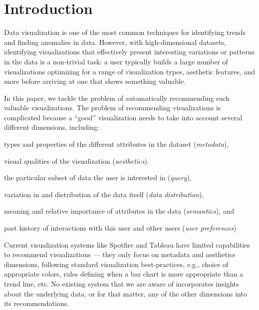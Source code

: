 
\section{Introduction}
\label{sec:introduction}


Data visualization is one of the most common techniques for identifying 
trends and finding anomalies in data.
However, with high-dimensional datasets, identifying visualizations that 
effectively present interesting variations or patterns in the data is a non-trivial task:  a
user typically builds a large number of visualizations optimizing for a range of visualization 
types, aesthetic features, and more
before arriving at one that shows something valuable.


In this paper, we tackle the problem of automatically recommending such valuable visualizations.
The problem of recommending visualizations is complicated because a ``good'' visualization needs to take into account several different dimensions, including:
\begin{inparaenum}
\item types and properties of the different attributes in the dataset ({\it metadata}), 
\item visual qualities of the visualization ({\it aesthetics}). 
\item the particular subset of data the user is interested in ({\it query}), 
\item variation in and distribution of the data itself ({\it data distribution}), 
\item meaning and relative importance of attributes in the data ({\it semantics}),  and
\item past history of interactions with this user and other users ({\it user preferences})
\end{inparaenum}

Current visualization systems like Spotfire and Tableau have limited capabilities to recommend visualizations --- they only focus on metadata and aesthetics dimensions, following standard visualization best-practices, e.g., choice of appropriate colors,
rules defining when a bar chart is more appropriate than a trend line, etc.  
No existing system that we are aware of 
incorporates insights about the underlying data, or for that matter, any of the other dimensions into its recommendations.


